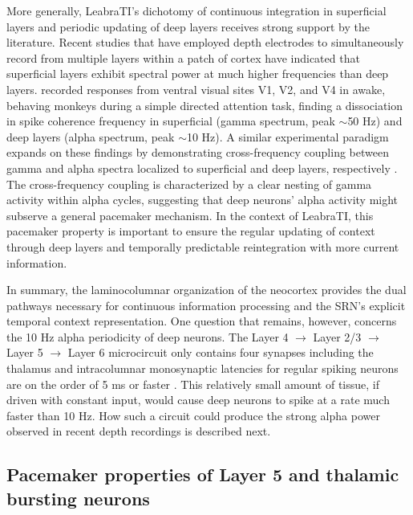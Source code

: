 \documentclass[dwyatte_dissertation.tex]{subfiles}
\begin{document}
More generally, LeabraTI's dichotomy of continuous integration in superficial layers and periodic updating of deep layers receives strong support by the literature. Recent studies that have employed depth electrodes to simultaneously record from multiple layers within a patch of cortex have indicated that superficial layers exhibit spectral power at much higher frequencies than deep layers.  recorded responses from ventral visual sites V1, V2, and V4 in awake, behaving monkeys during a simple directed attention task, finding a dissociation in spike coherence frequency in superficial (gamma spectrum, peak $\sim$50 Hz) and deep layers (alpha spectrum, peak $\sim$10 Hz). A similar experimental paradigm expands on these findings by demonstrating cross-frequency coupling between gamma and alpha spectra localized to superficial and deep layers, respectively \cite{SpaakBonnefondMaierEtAl12}. %
The cross-frequency coupling is characterized by a clear nesting of gamma activity within alpha cycles, suggesting that deep neurons' alpha activity might subserve a general pacemaker mechanism. In the context of LeabraTI, this pacemaker property is important to ensure the regular updating of context through deep layers and temporally predictable reintegration with more current information.

In summary, the laminocolumnar organization of the neocortex provides the dual pathways necessary for continuous information processing and the SRN's explicit temporal context representation. One question that remains, however, concerns the 10 Hz alpha periodicity of deep neurons. The Layer 4 $\rightarrow$ Layer 2/3 $\rightarrow$ Layer 5 $\rightarrow$ Layer 6 microcircuit only contains four synapses including the thalamus and intracolumnar monosynaptic latencies for regular spiking neurons are on the order of 5 ms or faster \cite{Armstrong-JamesFoxDas-Gupta92,LumerEdelmanTononi97}. This relatively small amount of tissue, if driven with constant input, would cause deep neurons to spike at a rate much faster than 10 Hz. How such a circuit could produce the strong alpha power observed in recent depth recordings is described next. %


\subsection{Pacemaker properties of Layer 5 and thalamic bursting neurons} %
\end{document}
